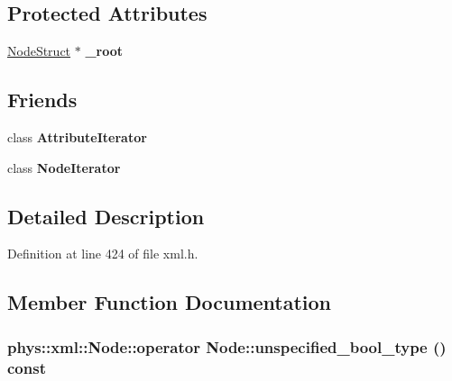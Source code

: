 \subsection*{Protected Attributes}
\begin{DoxyCompactItemize}
\item 
\hypertarget{classphys_1_1xml_1_1Node_ae76db7e7025e29af83e487cf4b270424}{
\hyperlink{structphys_1_1xml_1_1NodeStruct}{NodeStruct} $\ast$ {\bfseries \_\-root}}
\label{d7/d0a/classphys_1_1xml_1_1Node_ae76db7e7025e29af83e487cf4b270424}

\end{DoxyCompactItemize}
\subsection*{Friends}
\begin{DoxyCompactItemize}
\item 
\hypertarget{classphys_1_1xml_1_1Node_a1ed8790083a80b2604beba1c666bce6e}{
class {\bfseries AttributeIterator}}
\label{d7/d0a/classphys_1_1xml_1_1Node_a1ed8790083a80b2604beba1c666bce6e}

\item 
\hypertarget{classphys_1_1xml_1_1Node_ac5a1d2c6036b7ba1894a7c3b8d96a312}{
class {\bfseries NodeIterator}}
\label{d7/d0a/classphys_1_1xml_1_1Node_ac5a1d2c6036b7ba1894a7c3b8d96a312}

\end{DoxyCompactItemize}


\subsection{Detailed Description}


Definition at line 424 of file xml.h.



\subsection{Member Function Documentation}
\hypertarget{classphys_1_1xml_1_1Node_a1a3af56736ef4dd39596bb71607ebbc7}{
\subsubsection[{operator unspecified\_\-bool\_\-type}]{\setlength{\rightskip}{0pt plus 5cm}phys::xml::Node::operator Node::unspecified\_\-bool\_\-type () const}}
\label{d7/d0a/classphys_1_1xml_1_1Node_a1a3af56736ef4dd39596bb71607ebbc7}


